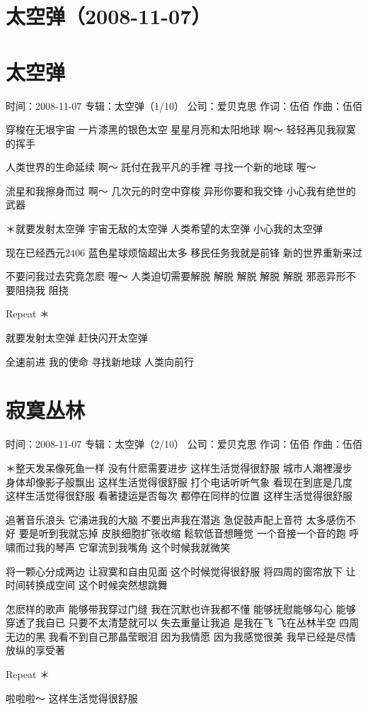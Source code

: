 \documentclass[UTF8,a4paper,oneside,twocolumn,12pt]{ctexbook}
\newcommand{\infopair}[2]{\textbullet #1：#2}
\newcommand{\zc}[1][伍佰]{\infopair{作词}{#1}}
\newcommand{\zq}[1][伍佰]{\infopair{作曲}{#1}}
\newcommand{\zj}[1]{\infopair{专辑}{#1}}
\newcommand{\sj}[1]{\infopair{时间}{#1}}
\newcommand{\gs}[1]{\infopair{公司}{#1}}
\newenvironment{info}{\begin{flushleft}\kaishu
	}
	{\end{flushleft}\normalsize\yahei\par}
\newenvironment{lyric}{
	}
{}
\begin{document}
\section*{太空弹（2008-11-07）}
\section{太空弹}
\begin{info}
	\sj{2008-11-07}
	\zj{太空弹（1/10）}
	\gs{爱贝克思}
	\zc
	\zq
\end{info}
\begin{lyric}
	穿梭在无垠宇宙
	一片漆黑的银色太空
	星星月亮和太阳地球
	啊～ 轻轻再见我寂寞的挥手

	人类世界的生命延续
	啊～ 託付在我平凡的手裡
	寻找一个新的地球
	喔～

	流星和我擦身而过
	啊～ 几次元的时空中穿梭
	异形你要和我交锋
	小心我有绝世的武器

	＊就要发射太空弹
	宇宙无敌的太空弹
	人类希望的太空弹
	小心我的太空弹

	现在已经西元2406
	蓝色星球烦恼超出太多
	移民任务我就是前锋
	新的世界重新来过

	不要问我过去究竟怎麽
	喔～ 人类迫切需要解脱
	解脱 解脱 解脱 解脱
	邪恶异形不要阻挠我
	阻挠

	Repeat ＊

	就要发射太空弹
	赶快闪开太空弹

	全速前进 我的使命
	寻找新地球 人类向前行
\end{lyric}

\section{寂寞丛林}
\begin{info}
	\sj{2008-11-07}
	\zj{太空弹（2/10）}
	\gs{爱贝克思}
	\zc
	\zq
\end{info}
\begin{lyric}
	＊整天发呆像死鱼一样 没有什麽需要进步 这样生活觉得很舒服
	城市人潮裡漫步 身体却像影子般飘出 这样生活觉得很舒服
	打个电话听听气象 看现在到底是几度 这样生活觉得很舒服
	看著捷运是否每次 都停在同样的位置 这样生活觉得很舒服

	追著音乐浪头 它涌进我的大脑 不要出声我在潜逃
	急促鼓声配上音符 太多感伤不好 要是听到我就忘掉
	皮肤细胞扩张收缩 鬆软低音想睡觉 一个音接一个音的跑
	呼啸而过我的琴声 它窜流到我嘴角 这个时候我就微笑

	将一颗心分成两边 让寂寞和自由见面 这个时候觉得很舒服
	将四周的窗帘放下 让时间转换成空间 这个时候突然想跳舞

	怎麽样的歌声 能够带我穿过门缝 我在沉默也许我都不懂
	能够抚慰能够勾心 能够穿透了我自已 只要不太清楚就可以
	失去重量让我追 是我在飞
	飞在丛林半空 四周无边的黑 我看不到自己那晶莹眼泪
	因为我情愿 因为我感觉很美 我早已经是尽情放纵的享受著

	Repeat ＊

	啦啦啦～ 这样生活觉得很舒服
\end{lyric}
\end{document}
